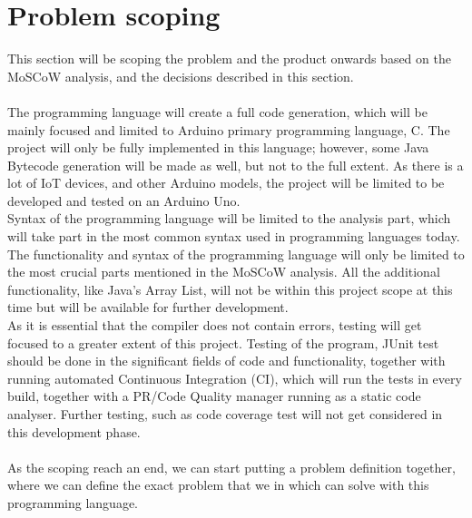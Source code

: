 \section{Problem scoping}
This section will be scoping the problem and the product onwards based on the MoSCoW analysis, and the decisions described in this section.  \\
\\
The programming language will create a full code generation, which will be mainly focused and limited to Arduino primary programming language, C. The project will only be fully implemented in this language; however, some Java Bytecode generation will be made as well, but not to the full extent. As there is a lot of IoT devices, and other Arduino models, the project will be limited to be developed and tested on an Arduino Uno.  \\
Syntax of the programming language will be limited to the analysis part, which will take part in the most common syntax used in programming languages today. The functionality and syntax of the programming language will only be limited to the most crucial parts mentioned in the MoSCoW analysis. All the additional functionality, like Java’s Array List, will not be within this project scope at this time but will be available for further development. \\
As it is essential that the compiler does not contain errors, testing will get focused to a greater extent of this project. Testing of the program, JUnit test should be done in the significant fields of code and functionality, together with running automated Continuous Integration (CI), which will run the tests in every build, together with a PR/Code Quality manager running as a static code analyser. Further testing, such as code coverage test will not get considered in this development phase.  \\
\\
As the scoping reach an end, we can start putting a problem definition together, where we can define the exact problem that we in which can solve with this programming language.  